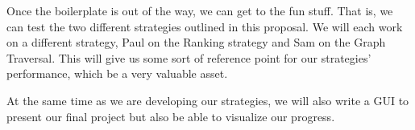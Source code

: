 \documentclass{article}
\begin{document}
\par Once the boilerplate is out of the way, we can get to the fun stuff. That is, we can test the two different strategies outlined in this proposal. We will each work on a different strategy, Paul on the Ranking strategy and Sam on the Graph Traversal. This will give us some sort of reference point for our strategies' performance, which be a very valuable asset.

\par At the same time as we are developing our strategies, we will also write a GUI to present our final project but also be able to visualize our progress.
\end{document}
